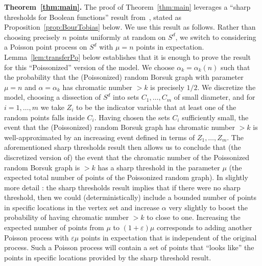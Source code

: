 \documentclass[11pt]{article}%
\newcommand{\Pee}[0]{\ensuremath{{\mathbb P}}}
\newcommand{\isd}[0]{\hspace{.2ex} \raisebox{-.1ex}{$=$} \hspace{-1.5ex} 
\raisebox{1ex}{{$\scriptstyle d$}} \hspace{.8ex} }
\newcommand{\eps}{\varepsilon}
\DeclareMathOperator{\Be}{Be}
\begin{document}
{\bf Theorem~\ref{thm:main}.}
The proof of Theorem~\ref{thm:main} leverages a ``sharp thresholds for Boolean functions'' result from~\cite{MullerConfetti}, stated as
Proposition~\ref{prop:BourTobias} below.
We use this result as follows. Rather than choosing precisely $n$ points uniformly at random on $S^d$, we 
switch to considering a Poisson point process on $S^d$ with $\mu = n$ points in expectation.
Lemma~\ref{lem:transferPo} below establishes that it is enough to prove the result for this ``Poissonized'' version 
of the model.
We choose $\alpha_k=\alpha_k(n)$ such that the probability that the 
(Poissonized) random Borsuk graph with parameter $\mu=n$ and $\alpha=\alpha_k$ has chromatic number $> k$ is precisely
$1/2$.
We discretize the model, choosing a dissection of $S^d$ into sets $C_1,\dots, C_m$ of small diameter, and for $i=1,\dots,m$ 
we take $Z_i$ to be the indicator variable that at least one of the random points falls inside $C_i$.
Having chosen the sets $C_i$ sufficiently small, the event that the (Poissonized) random Borsuk graph 
has chromatic number $> k$ is well-approximated by an increasing event defined in terms of $Z_1,\dots, Z_m$.
The aforementioned sharp thresholds result then allows us to conclude that (the discretized version of) the 
event that the chromatic number of the Poissonized random Borsuk graph is $> k$ has a sharp threshold 
in the parameter $\mu$ (the expected total number of points of the Poissonized random graph).
In slightly more detail : the sharp thresholds result implies that if there were no 
sharp threshold, then we could (deterministically) include a bounded number of points in specific locations in the 
vertex set and increase $\alpha$ very slightly to  
boost the probability of having chromatic number $> k$ to close to one. 
Increasing the expected number of points from $\mu$ to $(1+\eps)\mu$
corresponds to adding another Poisson process with $\eps\mu$ points in expectation that is independent of the 
original process. Such a 
Poisson process will contain a set of points that ``looks like'' the points in specific locations 
provided by the sharp threshold result.
\end{document}
